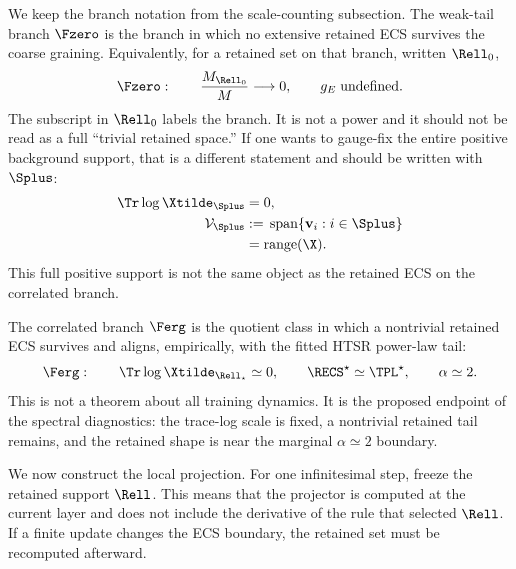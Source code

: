 We keep the branch notation from the scale-counting subsection.  The weak-tail branch \(\Fzero\) is the branch in which no extensive retained ECS survives the coarse graining.  Equivalently, for a retained set on that branch, written \(\Rell_0\),
\begin{equation}
  \Fzero:
  \qquad
  \frac{M_{\Rell_0}}{M}\longrightarrow 0,
  \qquad
  g_E\;\text{undefined}.
  \label{eq:Fzero_quotient}
\end{equation}
The subscript in \(\Rell_0\) labels the branch.  It is not a power and it should not be read as a full ``trivial retained space.''  If one wants to gauge-fix the entire positive background support, that is a different statement and should be written with \(\Splus\):
\begin{equation}
\begin{aligned}
  \Tr\log\Xtilde_{\Splus}&=0,\\
  \mathcal V_{\Splus}
  &:={}\operatorname{span}\{\mathbf v_i:i\in\Splus\}\\
  &=\operatorname{range}(\X).
\end{aligned}
  \label{eq:Splus_background_gauge}
\end{equation}
This full positive support is not the same object as the retained ECS on the correlated branch.

The correlated branch \(\Ferg\) is the quotient class in which a nontrivial retained ECS survives and aligns, empirically, with the fitted HTSR power-law tail:
\begin{equation}
  \Ferg:
  \qquad
  \Tr\log\Xtilde_{\Rell_\star}\simeq 0,
  \qquad
  \RECS^\star\simeq\TPL^\star,
  \qquad
  \alpha\simeq 2.
  \label{eq:Ferg_quotient}
\end{equation}
This is not a theorem about all training dynamics.  It is the proposed endpoint of the spectral diagnostics: the trace-log scale is fixed, a nontrivial retained tail remains, and the retained shape is near the marginal \(\alpha\simeq2\) boundary.

We now construct the local projection.  For one infinitesimal step, freeze the retained support \(\Rell\).  This means that the projector is computed at the current layer and does not include the derivative of the rule that selected \(\Rell\).  If a finite update changes the ECS boundary, the retained set must be recomputed afterward.

